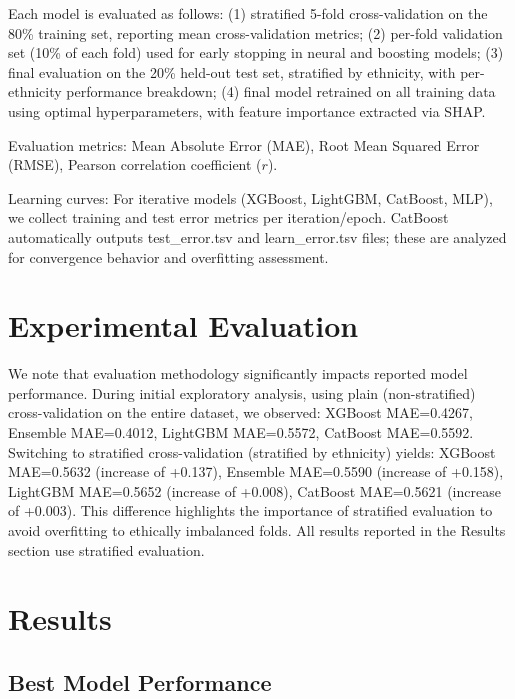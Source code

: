 \documentclass[a4paper,oneside,bibliography=totoc]{scrbook}
\begin{document}
Each model is evaluated as follows: (1) stratified 5-fold cross-validation on the 80\% training set, reporting mean cross-validation metrics; (2) per-fold validation set (10\% of each fold) used for early stopping in neural and boosting models; (3) final evaluation on the 20\% held-out test set, stratified by ethnicity, with per-ethnicity performance breakdown; (4) final model retrained on all training data using optimal hyperparameters, with feature importance extracted via SHAP.

Evaluation metrics: Mean Absolute Error (MAE), Root Mean Squared Error (RMSE), Pearson correlation coefficient ($r$).

Learning curves: For iterative models (XGBoost, LightGBM, CatBoost, MLP), we collect training and test error metrics per iteration/epoch. CatBoost automatically outputs test\_error.tsv and learn\_error.tsv files; these are analyzed for convergence behavior and overfitting assessment.

\chapter{Experimental Evaluation}
\label{ch:evaluation}

We note that evaluation methodology significantly impacts reported model performance. During initial exploratory analysis, using plain (non-stratified) cross-validation on the entire dataset, we observed: XGBoost MAE=0.4267, Ensemble MAE=0.4012, LightGBM MAE=0.5572, CatBoost MAE=0.5592. Switching to stratified cross-validation (stratified by ethnicity) yields: XGBoost MAE=0.5632 (increase of +0.137), Ensemble MAE=0.5590 (increase of +0.158), LightGBM MAE=0.5652 (increase of +0.008), CatBoost MAE=0.5621 (increase of +0.003). This difference highlights the importance of stratified evaluation to avoid overfitting to ethically imbalanced folds. All results reported in the Results section use stratified evaluation.

\chapter{Results}
\label{ch:results}

\section{Best Model Performance}
\end{document}
